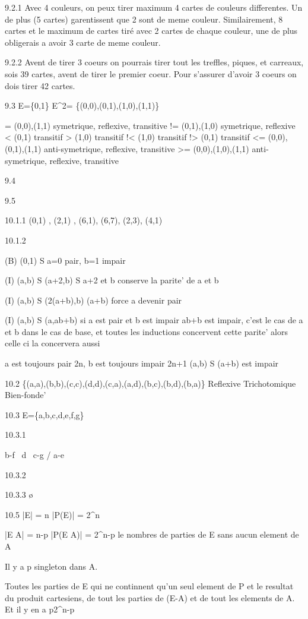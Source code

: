 9.2.1
Avec 4 couleurs, on peux tirer maximum 4 cartes de couleurs differentes. Un de plus (5 cartes) garentissent que 2 sont de meme couleur. Similairement, 8 cartes et le maximum de cartes tiré avec 2 cartes de chaque couleur, une de plus obligerais a avoir 3 carte de meme couleur.

9.2.2
Avent de tirer 3 coeurs on pourrais tirer tout les treffles, piques, et carreaux, sois 39 cartes, avent de tirer le premier coeur. Pour s'assurer d'avoir 3 coeurs on dois tirer 42 cartes.



9.3
E=\{0,1\}
E^2= \{(0,0),(0,1),(1,0),(1,1)\}

= 	(0,0),(1,1) symetrique, reflexive, transitive
!=	(0,1),(1,0) symetrique, reflexive
<	(0,1) transitif
>	(1,0) transitif
!<	(1,0) transitif
!>	(0,1) transitif
<=	(0,0),(0,1),(1,1) anti-symetrique, reflexive, transitive
>=	(0,0),(1,0),(1,1) anti-symetrique, reflexive, transitive


9.4


9.5




10.1.1
(0,1) , (2,1) , (6,1), (6,7), (2,3), (4,1)

10.1.2

(B) (0,1) \in S 
	a=0 pair, b=1 impair

(I) (a,b) \in S \rightarrow (a+2,b) \in S 
	a+2 et b conserve la parite' de a et b

(I) (a,b) \in S \rightarrow (2(a+b),b) (a+b) force a devenir pair

(I) (a,b) \in S \rightarrow (a,ab+b)
	si a est pair et b est impair ab+b est impair,
	c'est le cas de a et b dans le cas de base,
	et toutes les inductions concervent cette parite'
	alors celle ci la concervera aussi

	a est toujours pair 2n, b est toujours impair 2n+1 \rightarrow \forall(a,b) \in S (a+b) est impair

10.2
\{(a,a),(b,b),(c,c),(d,d),(c,a),(a,d),(b,c),(b,d),(b,a)\}
Reflexive
Trichotomique
Bien-fonde'


10.3
E=\{a,b,c,d,e,f,g\}

10.3.1

b-f
 \
  d
   \
  c-g
 /
a-e

10.3.2

10.3.3
\o


10.5
|E| = n
|P(E)| = 2^n

|E \setminus A| = n-p
|P(E \setminus A)| = 2^{n-p} le nombres de parties de E sans aucun element de A

Il y a p singleton dans A.

Toutes les parties de E qui ne continnent qu'un seul element de P et le resultat du produit cartesiens, de tout les parties de (E-A) et de tout les elements de A.
Et il y en a p2^{n-p}